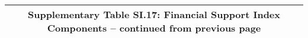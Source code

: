 \begin{longtable}{llcccccccccc}
\multicolumn{12}{c}{{\bfseries Supplementary Table SI.17: Financial Support Index Components -- continued from previous page}} \\ \hline                                                                                                                                                                                                                                                                                                                                                                                                                                                                                                                                                                                                                                                                                                                                                  

\end{longtable}
